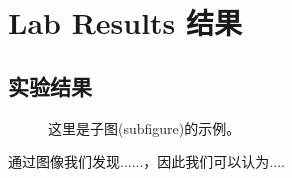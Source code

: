 \section{Lab Results 结果}
\subsection{实验结果}
\begin{figure}[htbp]
	\centering
	\caption{这里是子图(subfigure)的示例。}
	\label{fig:subfigure}
\end{figure}
通过图像我们发现......，因此我们可以认为....